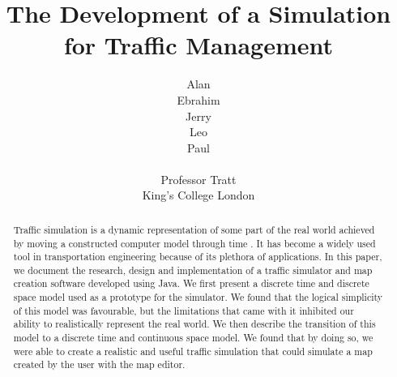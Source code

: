 \documentclass[11pt,a4paper]{article}
\begin{document}
\title{The Development of a Simulation for Traffic Management}
\author{Alan\\Ebrahim\\Jerry\\Leo\\Paul\\\\
Professor Tratt\\King's College London}
\maketitle
\begin{abstract}
Traffic simulation is a dynamic representation of some part of the real world achieved by moving a constructed computer model through time \cite{drew1968traffic}. It has become a widely used tool in transportation engineering because of its plethora of applications. In this paper, we document the research, design and implementation of a traffic simulator and  map creation software developed using Java. We first present a discrete time and discrete space model used as a prototype for the simulator. We found that the logical simplicity of this model was favourable, but the limitations that came with it inhibited our ability to realistically represent the real world. We then describe the transition of this model to a discrete time and continuous space model. We found that by doing so, we were able to create a realistic and useful traffic simulation that could simulate a map created by the user with the map editor.
\end{abstract}
\clearpage
\begin{tableofcontents}
\end{tableofcontents}
\clearpage
	
	
	
	
	
	
	

	\fancyfoot[C]{\thepage}
	
	
	
	\appendix
	
	
\end{document}
